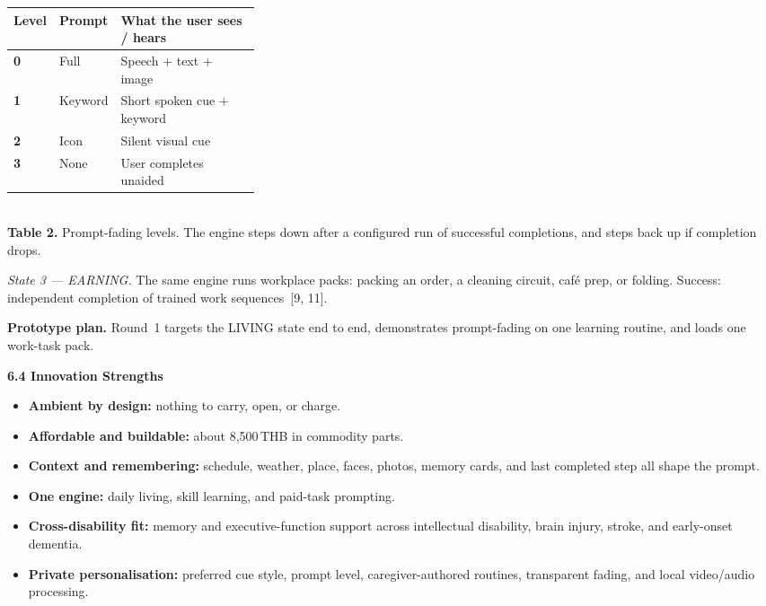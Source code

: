     \begin{center}
    {\footnotesize
    \renewcommand{\arraystretch}{1.05}
    \begin{tabularx}{\linewidth}{@{}>{\bfseries}p{0.12\linewidth} p{0.20\linewidth} X@{}}
      \hline
      Level & Prompt & What the user sees / hears \\
      \hline
      0 & Full & Speech + text + image \\
      1 & Keyword & Short spoken cue + keyword \\
      2 & Icon & Silent visual cue \\
      3 & None & User completes unaided \\
      \hline
    \end{tabularx}\\[0.3em]
    \textbf{Table 2.} Prompt-fading levels. The engine steps down after a
    configured run of successful completions, and steps back up if completion drops.
    }
    \end{center}

    \emph{State 3 --- EARNING.} The same engine runs workplace packs: packing an order,
    a cleaning circuit, caf\'e prep, or folding. Success: independent completion of
    trained work sequences~[9, 11].

    \textbf{Prototype plan.} Round~1 targets the LIVING state end to end, demonstrates
    prompt-fading on one learning routine, and loads one work-task pack.

    \textbf{6.4 Innovation Strengths}

    \begin{itemize}
      \item \textbf{Ambient by design:} nothing to carry, open, or charge.
      \item \textbf{Affordable and buildable:} about 8{,}500\,THB in commodity parts.
      \item \textbf{Context and remembering:} schedule, weather, place, faces, photos,
        memory cards, and last completed step all shape the prompt.
      \item \textbf{One engine:} daily living, skill learning, and paid-task prompting.
      \item \textbf{Cross-disability fit:} memory and executive-function support across
        intellectual disability, brain injury, stroke, and early-onset dementia.
      \item \textbf{Private personalisation:} preferred cue style, prompt level,
        caregiver-authored routines, transparent fading, and local video/audio processing.
    \end{itemize}
